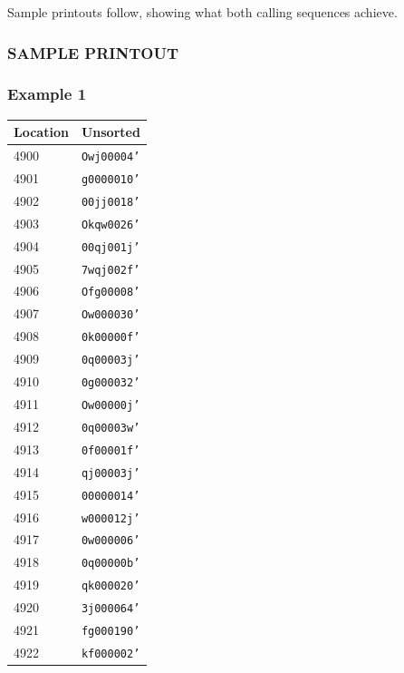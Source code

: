 Sample printouts follow, showing what both calling sequences achieve.

\subsubsection*{SAMPLE PRINTOUT}

\subsubsection*{Example 1}
\begin{table}[h!]
\centering
\begin{minipage}{0.48\textwidth}
\centering
\begin{tabular}{ll}
\toprule
\textbf{Location} & \textbf{Unsorted} \\
\midrule
4900 & \texttt{Owj00004'} \\
4901 & \texttt{g0000010'} \\
4902 & \texttt{00jj0018'} \\
4903 & \texttt{Okqw0026'} \\
4904 & \texttt{00qj001j'} \\
4905 & \texttt{7wqj002f'} \\
4906 & \texttt{Ofg00008'} \\
4907 & \texttt{Ow000030'} \\
4908 & \texttt{0k00000f'} \\
4909 & \texttt{0q00003j'} \\
4910 & \texttt{0g000032'} \\
4911 & \texttt{Ow00000j'} \\
4912 & \texttt{0q00003w'} \\
4913 & \texttt{0f00001f'} \\
4914 & \texttt{qj00003j'} \\
4915 & \texttt{00000014'} \\
4916 & \texttt{w000012j'} \\
4917 & \texttt{0w000006'} \\
4918 & \texttt{0q00000b'} \\
4919 & \texttt{qk000020'} \\
4920 & \texttt{3j000064'} \\
4921 & \texttt{fg000190'} \\
4922 & \texttt{kf000002'} \\
\bottomrule
\end{tabular}
\end{minipage}
\hfill
\begin{minipage}{0.48\textwidth}

\end{minipage}
\end{table}
